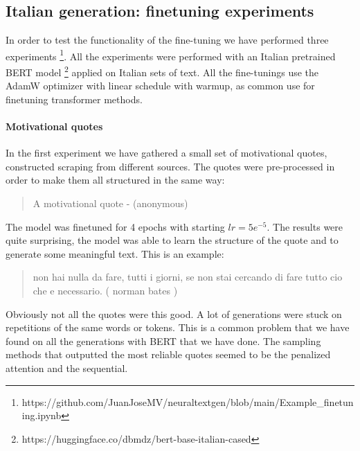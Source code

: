 \documentclass[10pt,twocolumn,letterpaper]{article}
\begin{document}
\subsection{Italian generation: finetuning experiments}
In order to test the functionality of the fine-tuning we have performed three experiments
\footnote[1]{https://github.com/JuanJoseMV/neuraltextgen/blob/main/Example\_finetuning.ipynb}.
All the experiments were performed with an Italian pretrained BERT model
\footnote[2]{https://huggingface.co/dbmdz/bert-base-italian-cased}
applied on Italian sets of text.
All the fine-tunings use the AdamW optimizer with linear schedule with warmup, as common use for finetuning transformer methods.

\paragraph{Motivational quotes} In the first experiment we have gathered a small set of motivational quotes,
constructed scraping from different sources. The quotes were pre-processed in order to make them
all structured in the same way:
\begin{quote}
   A motivational quote - (anonymous)
\end{quote}

The model was finetuned for 4 epochs with starting $lr=5e^{-5}$. The results were quite surprising,
the model was able to learn the structure of the quote and to generate some meaningful text.
This is an example:

\begin{quote}
non hai nulla da fare, tutti i giorni, se non stai cercando di fare tutto cio che e necessario. ( norman bates )
\end{quote}

Obviously not all the quotes were this good.
A lot of generations were stuck on repetitions of the same words or tokens.
This is a common problem that we have found on all the generations with BERT that we have done.
The sampling methods that outputted the most reliable quotes seemed to be the penalized attention and the sequential.
\end{document}
